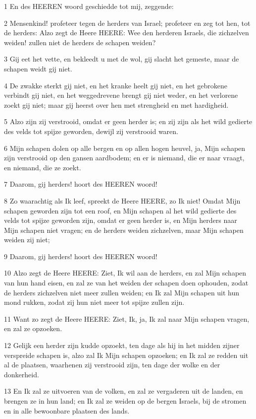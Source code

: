 \par 1 En des HEEREN woord geschiedde tot mij, zeggende:
\par 2 Mensenkind! profeteer tegen de herders van Israel; profeteer en zeg tot hen, tot de herders: Alzo zegt de Heere HEERE: Wee den herderen Israels, die zichzelven weiden! zullen niet de herders de schapen weiden?
\par 3 Gij eet het vette, en bekleedt u met de wol, gij slacht het gemeste, maar de schapen weidt gij niet.
\par 4 De zwakke sterkt gij niet, en het kranke heelt gij niet, en het gebrokene verbindt gij niet, en het weggedrevene brengt gij niet weder, en het verlorene zoekt gij niet; maar gij heerst over hen met strengheid en met hardigheid.
\par 5 Alzo zijn zij verstrooid, omdat er geen herder is; en zij zijn als het wild gedierte des velds tot spijze geworden, dewijl zij verstrooid waren.
\par 6 Mijn schapen dolen op alle bergen en op allen hogen heuvel, ja, Mijn schapen zijn verstrooid op den gansen aardbodem; en er is niemand, die er naar vraagt, en niemand, die ze zoekt.
\par 7 Daarom, gij herders! hoort des HEEREN woord!
\par 8 Zo waarachtig als Ik leef, spreekt de Heere HEERE, zo Ik niet! Omdat Mijn schapen geworden zijn tot een roof, en Mijn schapen al het wild gedierte des velds tot spijze geworden zijn, omdat er geen herder is, en Mijn herders naar Mijn schapen niet vragen; en de herders weiden zichzelven, maar Mijn schapen weiden zij niet;
\par 9 Daarom, gij herders! hoort des HEEREN woord!
\par 10 Alzo zegt de Heere HEERE: Ziet, Ik wil aan de herders, en zal Mijn schapen van hun hand eisen, en zal ze van het weiden der schapen doen ophouden, zodat de herders zichzelven niet meer zullen weiden; en Ik zal Mijn schapen uit hun mond rukken, zodat zij hun niet meer tot spijze zullen zijn.
\par 11 Want zo zegt de Heere HEERE: Ziet, Ik, ja, Ik zal naar Mijn schapen vragen, en zal ze opzoeken.
\par 12 Gelijk een herder zijn kudde opzoekt, ten dage als hij in het midden zijner verspreide schapen is, alzo zal Ik Mijn schapen opzoeken; en Ik zal ze redden uit al de plaatsen, waarhenen zij verstrooid zijn, ten dage der wolke en der donkerheid.
\par 13 En Ik zal ze uitvoeren van de volken, en zal ze vergaderen uit de landen, en brengen ze in hun land; en Ik zal ze weiden op de bergen Israels, bij de stromen en in alle bewoonbare plaatsen des lands.
